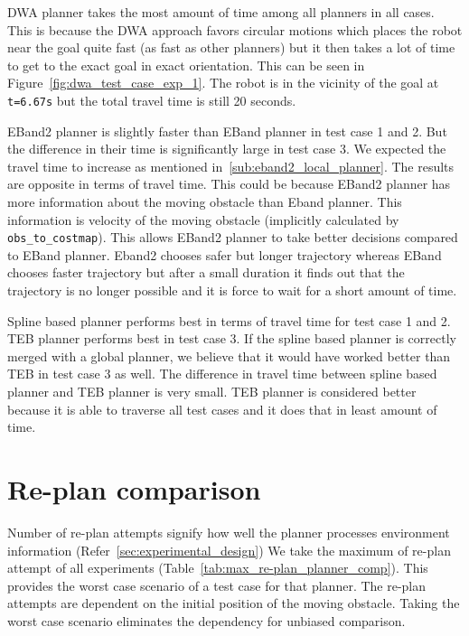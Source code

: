 DWA planner takes the most amount of time among
all planners in all cases. This is because the DWA approach favors circular motions which places the robot
near the goal quite fast (as fast as other planners) but it then takes a lot of time to get to the
exact goal in exact orientation. This can be seen in Figure~\ref{fig:dwa_test_case_exp_1}. The robot
is in the vicinity of the goal at \texttt{t=6.67s} but the total travel time is still 20 seconds.

EBand2 planner is slightly faster than EBand planner in test case 1 and 2. But the difference in 
their time is significantly large in test case 3. We expected the travel time to increase as mentioned
in~\ref{sub:eband2_local_planner}. The results are opposite in terms of travel time. This could be 
because EBand2 planner has more information about the moving obstacle than Eband planner. This 
information is velocity of the moving obstacle (implicitly calculated by \texttt{obs\_to\_costmap}).
This allows EBand2 planner to take better decisions compared to EBand planner. Eband2 chooses safer
but longer trajectory whereas EBand chooses faster trajectory but after a small duration it finds out
that the trajectory is no longer possible and it is force to wait for a short amount of time. 

Spline based planner performs best in terms of travel time for test case 1 and 2. TEB planner performs
best in test case 3. If the spline based planner is correctly merged with a global planner, we believe
that it would have worked better than TEB in test case 3 as well. The difference in travel time 
between spline based planner and TEB planner is very small. TEB planner is considered better 
because it is able to traverse all test cases and it does that in least amount of time.


\section{Re-plan comparison}%
\label{sec:re-plan_comparison}

Number of re-plan attempts signify how well the planner processes environment information (Refer~\ref{sec:experimental_design})
We take the maximum of re-plan attempt of all experiments (Table~\ref{tab:max_re-plan_planner_comp}).
This provides the worst case scenario of 
a test case for that planner. The re-plan attempts are dependent on the initial position of the moving
obstacle. Taking the worst case scenario eliminates the dependency for unbiased comparison.

